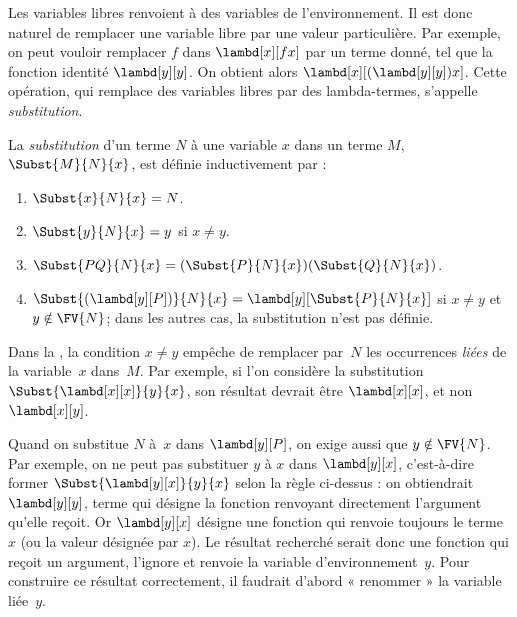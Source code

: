 \documentclass[../../../include/open-logic-section]{subfiles}
\begin{document}

\begin{explain}
Les variables libres renvoient à des variables
de l'environnement. Il est donc naturel de
remplacer une variable libre par une valeur
particulière. Par exemple, on peut vouloir
remplacer $f$ dans $\lambd[x][f x]$ par
un terme donné, tel que la fonction identité
$\lambd[y][y]$. On obtient alors
$\lambd[x][(\lambd[y][y]) x]$. Cette opération,
qui remplace des variables libres par des
lambda-termes, s'appelle \emph{substitution}.
\end{explain}

\begin{defn}[Substitution] 
La \emph{substitution} d'un terme $N$ à une
variable $x$ dans un terme $M$,
$\Subst{M}{N}{x}$, est définie inductivement
par :
\begin{enumerate}
  \item $\Subst{x}{N}{x} = N$.
  \item $\Subst{y}{N}{x} = y$ si $x \neq y$.
  \item $\Subst{PQ}{N}{x} =
    (\Subst{P}{N}{x})(\Subst{Q}{N}{x})$.
  \item $\Subst{(\lambd[y][P])}{N}{x} =
    \lambd[y][\Subst{P}{N}{x}]$ si
    $x \neq y$ et $y \notin \FV{N}$;
    dans les autres cas, la substitution
    n'est pas définie.
\end{enumerate}
\end{defn}

\begin{explain}
Dans la ,
la condition $x \neq y$ empêche de remplacer
par~$N$ les occurrences \emph{liées} de la
variable~$x$ dans~$M$. Par exemple, si l'on
considère la substitution
$\Subst{\lambd[x][x]}{y}{x}$, son résultat
devrait être $\lambd[x][x]$, et non
$\lambd[x][y]$.

Quand on substitue $N$ à~$x$ dans
$\lambd[y][P]$, on exige aussi que
$y \notin \FV{N}$. Par exemple, on ne peut
pas substituer $y$ à $x$ dans
$\lambd[y][x]$, c'est-à-dire former
$\Subst{\lambd[y][x]}{y}{x}$ selon la règle
ci-dessus : on obtiendrait
$\lambd[y][y]$, terme qui désigne la
fonction renvoyant directement l'argument
qu'elle reçoit. Or $\lambd[y][x]$ désigne
une fonction qui renvoie toujours le terme~$x$
(ou la valeur désignée par $x$). Le résultat
recherché serait donc une fonction qui reçoit
un argument, l'ignore et renvoie la variable
d'environnement~$y$. Pour construire ce résultat
correctement, il faudrait d'abord « renommer »
la variable liée~$y$.
\end{explain}
\end{document}
